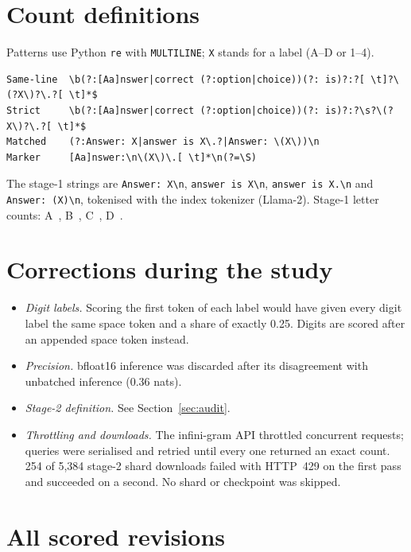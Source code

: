 \documentclass[11pt,a4paper]{article}
\begin{document}
\section{Count definitions}\label{app:defs}
Patterns use Python \texttt{re} with \texttt{MULTILINE}; \texttt{X} stands for a label (A--D or 1--4).
{\footnotesize
\begin{verbatim}
Same-line  \b(?:[Aa]nswer|correct (?:option|choice))(?: is)?:?[ \t]?\(?X\)?\.?[ \t]*$
Strict     \b(?:[Aa]nswer|correct (?:option|choice))(?: is)?:?\s?\(?X\)?\.?[ \t]*$
Matched    (?:Answer: X|answer is X\.?|Answer: \(X\))\n
Marker     [Aa]nswer:\n\(X\)\.[ \t]*\n(?=\S)
\end{verbatim}
}
The stage-1 strings are \verb|Answer: X\n|, \verb|answer is X\n|, \verb|answer is X.\n| and \verb|Answer: (X)\n|, tokenised with the index tokenizer (Llama-2). Stage-1 letter counts: A~\CountStageOneA, B~\CountStageOneB, C~\CountStageOneC, D~\CountStageOneD.

\section{Corrections during the study}
\begin{itemize}
\item \emph{Digit labels.} Scoring the first token of each label would have given every digit label the same space token and a share of exactly 0.25. Digits are scored after an appended space token instead.
\item \emph{Precision.} bfloat16 inference was discarded after its disagreement with unbatched inference (0.36 nats).
\item \emph{Stage-2 definition.} See Section~\ref{sec:audit}.
\item \emph{Throttling and downloads.} The infini-gram API throttled concurrent requests; queries were serialised and retried until every one returned an exact count. 254 of 5{,}384 stage-2 shard downloads failed with HTTP~429 on the first pass and succeeded on a second. No shard or checkpoint was skipped.
\end{itemize}

\clearpage
\section{All scored revisions}
\begingroup\scriptsize\setlength{\tabcolsep}{3pt}

\endgroup
\end{document}
